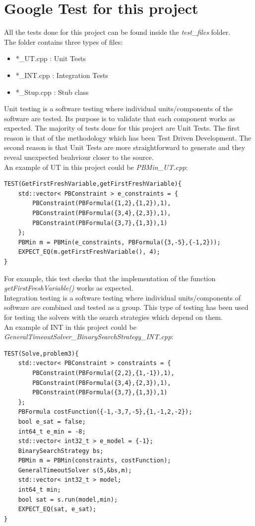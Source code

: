 \section{Google Test for this project}
All the tests done for this project can be found inside the \emph{test\_files} folder.\\
The folder contains three types of files:
\begin{itemize}
	\item *\_UT.cpp : Unit Tests
	\item *\_INT.cpp : Integration Tests
	\item *\_Stup.cpp : Stub class
\end{itemize}
Unit testing is a software testing where individual units/components of the software are tested. Its purpose is to validate that each component works as expected. The majority of tests done for this project are Unit Tests. The first reason is that of the methodology which has been Test Driven Development. The second reason is that Unit Tests are more straightforward to generate and they reveal unexpected beahviour closer to the source.\\
An example of UT in this project could be \emph{PBMin\_UT.cpp}:
\begin{verbatim}
TEST(GetFirstFreshVariable,getFirstFreshVariable){
	std::vector< PBConstraint > e_constraints = {
		PBConstraint(PBFormula({1,2},{1,2}),1),
		PBConstraint(PBFormula({3,4},{2,3}),1),
		PBConstraint(PBFormula({3,7},{1,3}),1)
	};
	PBMin m = PBMin(e_constraints, PBFormula({3,-5},{-1,2}));
	EXPECT_EQ(m.getFirstFreshVariable(), 4);
}
\end{verbatim}
For example, this test checks that the implementation of the function \emph{getFirstFreshVariable()} works as expected.\\
Integration testing is a software testing where individual units/components of software are combined and tested as a group. This type of testing has been used for testing the solvers with the search strategies which depend on them.\\
An example of INT in this project could be \emph{GeneralTimeoutSolver\_BinarySearchStrategy\_INT.cpp}:
\begin{verbatim}
TEST(Solve,problem3){
	std::vector< PBConstraint > constraints = {
		PBConstraint(PBFormula({2,2},{1,-1}),1),
		PBConstraint(PBFormula({3,4},{2,3}),1),
		PBConstraint(PBFormula({3,7},{1,3}),1)
	};
	PBFormula costFunction({-1,-3,7,-5},{1,-1,2,-2});
	bool e_sat = false;
	int64_t e_min = -8;
	std::vector< int32_t > e_model = {-1};
	BinarySearchStrategy bs;
	PBMin m = PBMin(constraints, costFunction);
	GeneralTimeoutSolver s(5,&bs,m);
	std::vector< int32_t > model;
	int64_t min;
	bool sat = s.run(model,min);
	EXPECT_EQ(sat, e_sat);
}
\end{verbatim}
